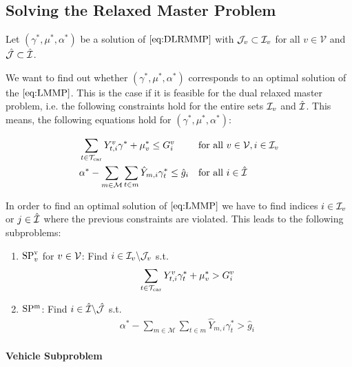 
\subsection{Solving the Relaxed Master Problem}

Let $\left(\gamma^*,\mu^*,\alpha^*\right)$ be a solution of $\eqref{eq:DLRMMP}$ with $\mathcal{J}_v\subset\mathcal{I}_v$ for all $v\in\mathcal{V}$ and $\hat{\mathcal{J}}\subset\hat{\mathcal{I}}$. 

We want to find out whether $\left(\gamma^*,\mu^*,\alpha^*\right)$ corresponds to an optimal solution of the $\eqref{eq:LMMP}$. This is the case if it is feasible for the dual relaxed master problem, i.e. the following constraints hold for the entire sets $\mathcal{I}_v$ and $\hat{\mathcal{I}}$. This means, the following equations hold for $\left(\gamma^*,\mu^*,\alpha^*\right)$:

\begin{align}
	& \sum_{t\in\mathcal{T}_{\operatorname{car}}} Y^v_{t,i}\gamma^* + \mu^*_v \leq G^v_i && \text{for all } v\in\mathcal{V},i\in\mathcal{I}_v \label{eq:DLMMP:vehicle} \\
	& \alpha^* - \sum_{m\in\mathcal{M}}\sum_{t\in m}\hat{Y}_{m,i}\gamma^*_t \leq \hat{g}_i && \text{for all } i\in\hat{\mathcal{I}} \label{eq:DLMMP:route}
\end{align}

In order to find an optimal solution of $\eqref{eq:LMMP}$ we have to find indices $i\in\mathcal{I}_v$ or $j\in\hat{\mathcal{I}}$ where the previous constraints are violated. This leads to the following subproblems:

\begin{enumerate}
	\item{$\operatorname{SP}^{\operatorname{v}}_v$ for $v\in\mathcal{V}$: Find $i\in\mathcal{I}_v\backslash\mathcal{J}_v $ s.t.}
		\begin{align*}
			\sum_{t\in\mathcal{T}_{\operatorname{car}}}Y^v_{t,i}\gamma^*_t + \mu^*_v > G^v_i
		\end{align*}
	\item{$\operatorname{SP^m}$: Find $i\in\hat{\mathcal{I}}\backslash\hat{\mathcal{J}}$ s.t.}
		\begin{align*}
			\alpha^*-\sum_{m\in\mathcal{M}}\sum_{t\in m}\hat{Y}_{m,i}\gamma^*_t > \hat{g}_i
		\end{align*}
\end{enumerate}

\paragraph{Vehicle Subproblem} \parfill

